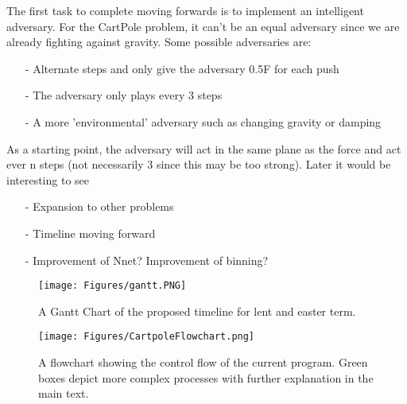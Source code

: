 \documentclass[a4paper]{article}
\begin{document}
The first task to complete moving forwards is to implement an intelligent adversary. For the CartPole problem, it can’t be an equal adversary since we are already fighting against gravity. Some possible adversaries are: 
\begin{itemize}
   \item[-] Alternate steps and only give the adversary 0.5F for each push
   \item[-] The adversary only plays every 3 steps
   \item[-] A more 'environmental' adversary such as changing gravity or damping 
\end{itemize}
 As a starting point, the adversary will act in the same plane as the force and act ever n steps (not necessarily 3 since this may be too strong). Later it would be interesting to see 

\begin{itemize}
   \item[-] Expansion to other problems
   \item[-] Timeline moving forward
   \item[-] Improvement of Nnet? Improvement of binning?
\end{itemize}

\begin{figure}[h]
   \centering
   \texttt{[image: Figures/gantt.PNG]}
   \caption{\label{fig:gantt} A Gantt Chart of the proposed timeline for lent and easter term.}
\end{figure}





\begin{figure}[b]
   \centering
   \texttt{[image: Figures/CartpoleFlowchart.png]}
   \caption{\label{fig:flowchart} A flowchart showing the control flow of the current program. Green boxes depict more complex processes with further explanation in the main text.}
\end{figure}
\end{document}
